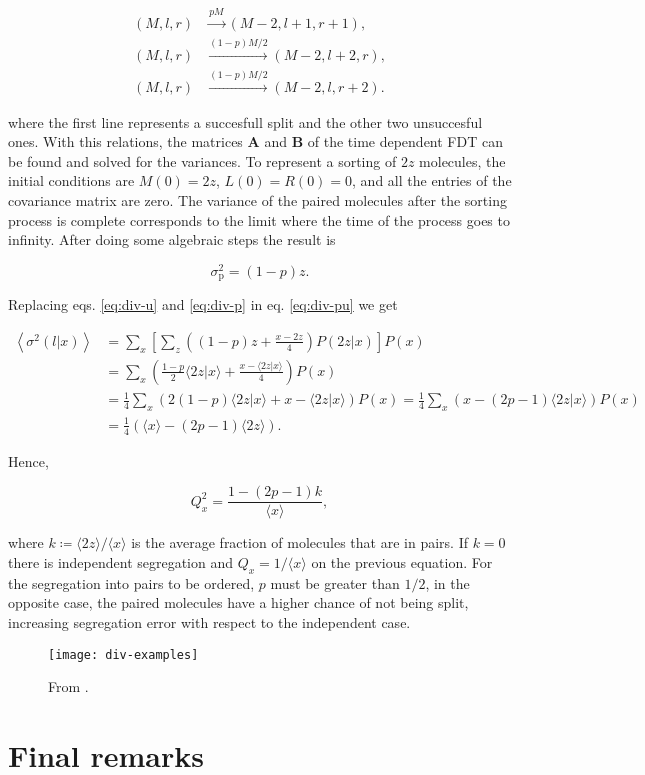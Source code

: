 \begin{equation*}
  \begin{split}
    (M,l,r)&\xrightarrow{pM}(M-2,l+1,r+1),\\
    (M,l,r)&\xrightarrow{(1-p)M/2}(M-2,l+2,r),\\
    (M,l,r)&\xrightarrow{(1-p)M/2}(M-2,l,r+2).
  \end{split}
\end{equation*}

where the first line represents a succesfull split and the other two unsuccesful ones. With this relations, the matrices $\mathbf{A}$ and $\mathbf{B}$ of the time dependent FDT can be found and solved for the variances. To represent a sorting of $2z$ molecules, the initial conditions are $M(0) = 2z$, $L(0) = R(0)=0$, and all the entries of the covariance matrix are zero. The variance of the paired molecules after the sorting process is complete corresponds to the limit where the time of the process goes to infinity. After doing some algebraic steps the result is

\begin{equation}
  \label{eq:div-p}
  \sigma^2_\text{p}=(1-p)z.
\end{equation}

Replacing eqs. \eqref{eq:div-u} and \eqref{eq:div-p} in eq. \eqref{eq:div-pu} we get

\begin{equation*}
  \begin{split}
    \left\langle\sigma^2(l|x)\right\rangle &=\sum_{x}\left[\sum_z\left((1-p)z+\frac{x-2z}{4}\right)P(2z|x)\right]P(x)\\
&=\sum_x\left(\frac{1-p}{2}\langle 2z|x\rangle+\frac{x-\langle 2z|x\rangle}{4}\right)P(x)\\
    &=\frac{1}{4}\sum_x\left(2(1-p)\langle 2z|x\rangle+x-\langle 2z|x\rangle\right)P(x) = \frac{1}{4}\sum_x\left(x-(2p-1)\langle 2z|x\rangle\right)P(x)\\
    &=\frac{1}{4}\left(\langle x\rangle - (2p-1)\langle 2z\rangle\right).
  \end{split}
\end{equation*}

Hence,

\begin{equation*}
  Q_x^2 = \frac{1 - (2p-1)k}{\langle x\rangle},
\end{equation*}

where $k\coloneqq\langle 2z\rangle/\langle x\rangle$ is the average fraction of molecules that are in pairs. If $k=0$ there is independent segregation and $Q_x = 1/\langle x\rangle$ on the previous equation. For the segregation into pairs to be ordered, $p$ must be greater than $1/2$, in the opposite case, the paired molecules have a higher chance of not being split, increasing segregation error with respect to the independent case.


\begin{figure}[H]
  \centering
  \texttt{[image: div-examples]}
  \caption[FILL]{\label{fig:div-examples4} From \cite{pedraza08}.}
\end{figure}

\section{Final remarks}
